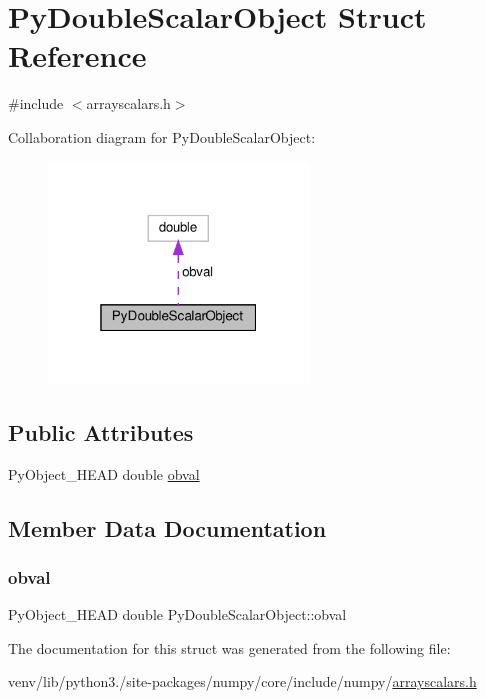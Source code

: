 \hypertarget{structPyDoubleScalarObject}{}\section{Py\+Double\+Scalar\+Object Struct Reference}
\label{structPyDoubleScalarObject}


{\ttfamily \#include $<$arrayscalars.\+h$>$}



Collaboration diagram for Py\+Double\+Scalar\+Object\+:
\nopagebreak
\begin{figure}[H]
\begin{center}
\leavevmode
\includegraphics[width=196pt]{structPyDoubleScalarObject__coll__graph}
\end{center}
\end{figure}
\subsection*{Public Attributes}
\begin{DoxyCompactItemize}
\item 
Py\+Object\+\_\+\+H\+E\+AD double \hyperlink{structPyDoubleScalarObject_a34c69251a2327a2a4ffb932da026a65c}{obval}
\end{DoxyCompactItemize}


\subsection{Member Data Documentation}
\mbox{\label{structPyDoubleScalarObject_a34c69251a2327a2a4ffb932da026a65c}} 
\subsubsection{\texorpdfstring{obval}{obval}}
{\footnotesize\ttfamily Py\+Object\+\_\+\+H\+E\+AD double Py\+Double\+Scalar\+Object\+::obval}



The documentation for this struct was generated from the following file\+:\begin{DoxyCompactItemize}
\item 
venv/lib/python3./site-\/packages/numpy/core/include/numpy/\hyperlink{arrayscalars_8h}{arrayscalars.\+h}\end{DoxyCompactItemize}
